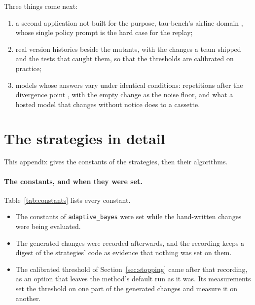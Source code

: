 \documentclass[11pt,a4paper]{article}
\newcommand{\strat}[1]{\texttt{#1}}
\begin{document}
Three things come next:
\begin{enumerate}
  \item a second application not built for the purpose, tau-bench's airline domain
        \cite{yao2024taubench,barres2025tau2}, whose single policy prompt is the hard case for the replay;
  \item real version histories beside the mutants, with the changes a team shipped and the tests that caught them,
        so that the thresholds are calibrated on practice;
  \item models whose answers vary under identical conditions: repetitions after the divergence point
        \cite{miller2024error,bjarnason2026randomness}, with the empty change as the noise floor, and what a
        hosted model that changes without notice does to a cassette.
\end{enumerate}




\appendix
\section{The strategies in detail}
\label{sec:appendix}

This appendix gives the constants of the strategies, then their algorithms.

\paragraph{The constants, and when they were set.} Table~\ref{tab:constants} lists every constant.
\begin{itemize}
  \item The constants of \strat{adaptive\_bayes} were set while the hand-written changes were being evaluated.
  \item The generated changes were recorded afterwards, and the recording keeps a digest of the strategies' code
        as evidence that nothing was set on them.
  \item The calibrated threshold of Section~\ref{sec:stopping} came after that recording, as an option that
        leaves the method's default run as it was. Its measurements set the threshold on one part of the
        generated changes and measure it on another.
\end{itemize}
\end{document}
